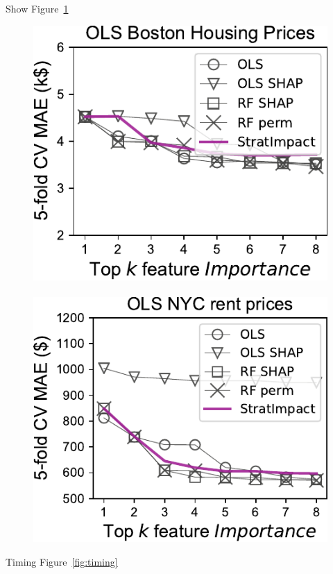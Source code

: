 \documentclass[11pt]{article}
\newcommand{\figref}[1]{Figure~\ref{#1}}
\begin{document}
Show \figref{fig:OLS}

\begin{figure}[htbp]
\begin{center}
\includegraphics[scale=0.5]{images/boston-topk-OLS-Importance.pdf}~~~
\includegraphics[scale=0.5]{images/rent-topk-OLS-Importance.pdf}
\label{fig:OLS}
\end{center}
\end{figure}


Timing \figref{fig:timing}
\end{document}
